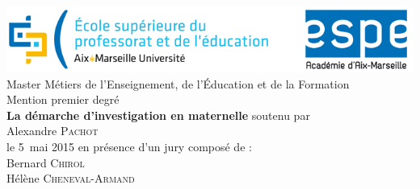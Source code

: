 \begin{titlepage}
	\center
	\includegraphics[width=\linewidth]{../images/logo_espe.jpg}\\
	\vfill
	\Large 
	Master \og Métiers de l'Enseignement, de l’Éducation et de la Formation \fg{}\\
	Mention premier degré\\
	\vfill
	\Huge\textbf{La démarche d’investigation en maternelle}
	\vfill
	\Large 
	soutenu par\\
	Alexandre \textsc{Pachot}\\
	le 5~mai 2015
	\vfill
	\large
	en présence d’un jury composé de :\\
	Bernard \textsc{Chirol}\\
	Hélène \textsc{Cheneval-Armand}%
\end{titlepage}
\vfill